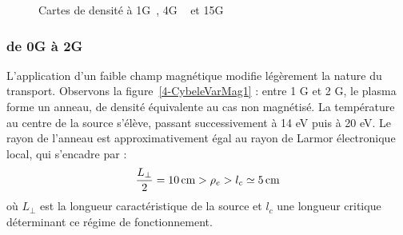 \begin{refsection}
\begin{figure}[!htbp]
  \centering
    \caption{Cartes de densité à 1G~, 4G
    ~ et 15G }
    \label{4-CybeleVarMag-1}
\end{figure}

\subsubsection{de 0G à 2G}

L'application d'un faible champ magnétique modifie légèrement la nature du
transport. Observons la figure~\ref{4-CybeleVarMag1} : entre 1 G et 2 G, le
plasma forme un anneau, de densité équivalente au cas non
magnétisé. La température au centre de la source s'élève, passant 
successivement à 14 eV puis à 20 eV. Le rayon de l'anneau est approximativement
égal au rayon de Larmor électronique local, qui s'encadre par :
\begin{equation}
\frac{L_\perp}{2}=10\,\text{cm}>\rho{_{e}}>l_c\simeq 5\,\text{cm}
\end{equation}
où $L_\perp$ est la longueur caractéristique de la source et $l_c$ une longueur
critique déterminant ce régime de fonctionnement. 


\end{refsection}
